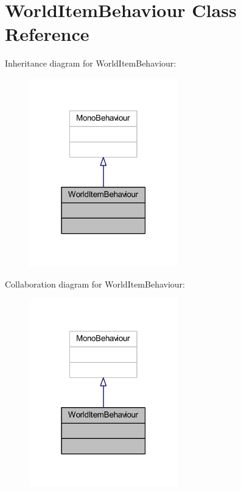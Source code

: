 \hypertarget{class_world_item_behaviour}{}\section{World\+Item\+Behaviour Class Reference}
\label{class_world_item_behaviour}


Inheritance diagram for World\+Item\+Behaviour\+:
\nopagebreak
\begin{figure}[H]
\begin{center}
\leavevmode
\includegraphics[width=183pt]{class_world_item_behaviour__inherit__graph}
\end{center}
\end{figure}


Collaboration diagram for World\+Item\+Behaviour\+:
\nopagebreak
\begin{figure}[H]
\begin{center}
\leavevmode
\includegraphics[width=183pt]{class_world_item_behaviour__coll__graph}
\end{center}
\end{figure}


